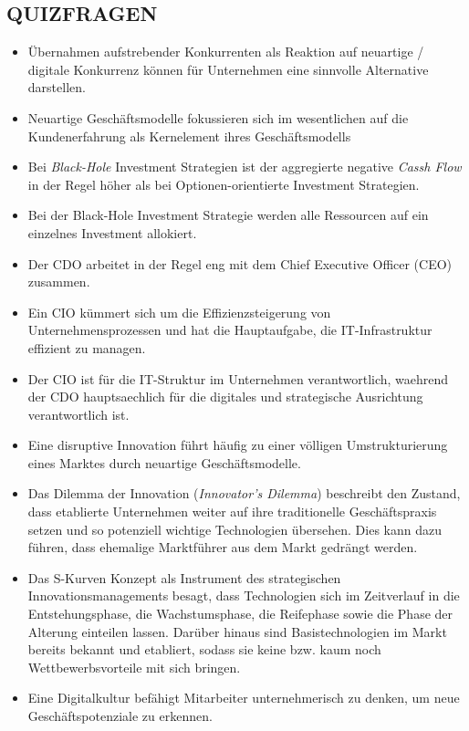 \documentclass[12pt,a4paper]{article}
\begin{document}
\subsection{QUIZFRAGEN} %
\begin{itemize}
   \item Übernahmen aufstrebender Konkurrenten als Reaktion auf neuartige / digitale Kon\-kur\-renz können für Unternehmen eine sinnvolle Alternative darstellen.
   \item Neuartige Geschäftsmodelle fokussieren sich im wesentlichen auf die Kundenerfahrung als Kernelement ihres Geschäftsmodells
   
   \item Bei \emph{Black-Hole} Investment Strategien ist der aggregierte negative \emph{Cassh Flow} in der Regel höher als bei Optionen-orientierte Investment Strategien.
   \item Bei der Black-Hole Investment Strategie werden alle Ressourcen auf ein einzelnes Investment allokiert.
   
   \item Der CDO arbeitet in der Regel eng mit dem Chief Executive Officer (CEO) zusammen.
   \item Ein CIO kümmert sich um die Effizienzsteigerung von Unternehmensprozessen und hat die Hauptaufgabe, die IT-Infrastruktur effizient zu managen.
   \item Der CIO ist für die IT-Struktur im Unternehmen verantwortlich, waehrend der CDO hauptsaechlich für die digitales und strategische Ausrichtung verantwortlich ist.
   
   \item Eine disruptive Innovation führt häufig zu einer völligen Umstrukturierung eines Marktes durch neuartige Geschäftsmodelle.
   
   \item Das Dilemma der Innovation (\textit{Innovator's Dilemma}) beschreibt den Zustand, dass etablierte Unternehmen weiter auf ihre traditionelle Geschäftspraxis setzen und so potenziell wichtige Technologien übersehen.
         Dies kann dazu führen, dass ehemalige Marktführer aus dem Markt gedrängt werden.
         
   \item Das S-Kurven Konzept als Instrument des strategischen Innovationsmanagements besagt, dass Technologien sich im Zeitverlauf in die Entstehungsphase, die Wachstumsphase, die Reifephase sowie die Phase der Alterung einteilen lassen.
         Darüber hinaus sind Basistechnologien im Markt bereits bekannt und etabliert, sodass sie keine bzw. kaum noch Wettbewerbsvorteile mit sich bringen.
         
   \item Eine Digitalkultur befähigt Mitarbeiter unternehmerisch zu denken, um neue Ge\-schäfts\-po\-ten\-zia\-le zu erkennen.
\end{itemize}
\end{document}
